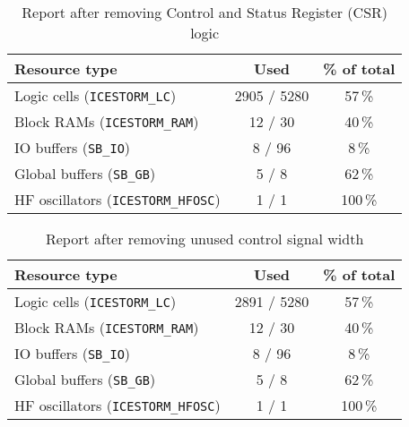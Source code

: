 \documentclass[a4paper,10pt]{article}
\begin{document}
\begin{table}[H] 
    \centering
    \begin{tabularx}{0.65\textwidth}{X c c}
        \toprule
        Resource type & Used & \% of total \\ \midrule
        Logic cells (\texttt{ICESTORM\_LC}) & 2905 / 5280 & 57\,\% \\
        Block RAMs (\texttt{ICESTORM\_RAM}) & 12 / 30 & 40\,\% \\
        IO buffers (\texttt{SB\_IO}) & 8 / 96 & 8\,\% \\
        Global buffers (\texttt{SB\_GB}) & 5 / 8 & 62\,\% \\
        HF oscillators (\texttt{ICESTORM\_HFOSC}) & 1 / 1 & 100\,\% \\
        \bottomrule
    \end{tabularx}
    \caption{Report after removing Control and Status Register (CSR) logic}
    \label{tab:CSR}
\end{table}

\begin{table}[H] 
    \centering
    \begin{tabularx}{0.65\textwidth}{X c c}
        \toprule
        Resource type & Used & \% of total \\ \midrule
        Logic cells (\texttt{ICESTORM\_LC}) & 2891 / 5280 & 57\,\% \\
        Block RAMs (\texttt{ICESTORM\_RAM}) & 12 / 30 & 40\,\% \\
        IO buffers (\texttt{SB\_IO}) & 8 / 96 & 8\,\% \\
        Global buffers (\texttt{SB\_GB}) & 5 / 8 & 62\,\% \\
        HF oscillators (\texttt{ICESTORM\_HFOSC}) & 1 / 1 & 100\,\% \\
        \bottomrule
    \end{tabularx}
    \caption{Report after removing unused control signal width}
    \label{tab:Signal_Width}
\end{table}
\end{document}
